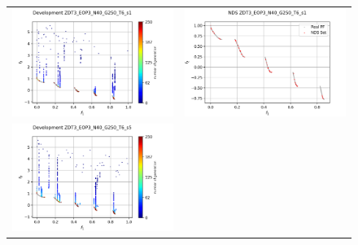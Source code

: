 \begin{figure}[H]
    \centering
    \begin{tabular}{c c}
    \includegraphics[scale=0.5]{figures/ZDT3_EOP3_N40_G250_T6/s1_dev.png} &
    \includegraphics[scale=0.5]{figures/ZDT3_EOP3_N40_G250_T6/s1_nds.png}\\
    \includegraphics[scale=0.5]{figures/ZDT3_EOP3_N40_G250_T6/s5_dev.png} &

\end{tabular}
\end{figure}
